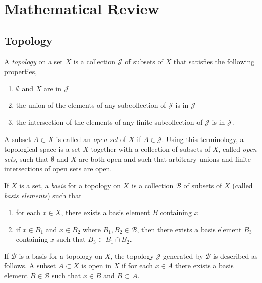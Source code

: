 \chapter{Mathematical Review}

\section{Topology}

\begin{definition}
A \emph{topology} on a set $X$ is a collection $\mathcal{J}$ of subsets of $X$ that satisfies the following properties,
\begin{enumerate}
\item $\emptyset$ and $X$ are in $\mathcal{J}$
\item the union of the elements of any subcollection of $\mathcal{J}$ is in $\mathcal{J}$
\item the intersection of the elements of any finite subcollection of $\mathcal{J}$ is in $\mathcal{J}$.
\end{enumerate}
\end{definition}

A subset $A \subset X$ is called an \emph{open set} of $X$ if $A \in \mathcal{J}$.
Using this terminology, a topological space is a set $X$ together with a collection of subsets of $X$, called \emph{open sets}, such that $\emptyset$ and $X$ are both open and such that arbitrary unions and finite intersections of open sets are open.

\begin{definition}
If $X$ is a set, a \emph{basis} for a topology on $X$ is a collection $\mathcal{B}$ of subsets of $X$ (called \emph{basis elements}) such that
\begin{enumerate}
\item for each $x \in X$, there exists a basis element $B$ containing $x$
\item if $x \in B_1$ and $x \in B_2$ where $B_1, B_2 \in \mathcal{B}$, then there exists a basis element $B_3$ containing $x$ such that $B_3 \subset B_1 \cap B_2$.
\end{enumerate}
\end{definition}

If $\mathcal{B}$ is a basis for a topology on $X$, the topology $\mathcal{J}$ generated by $\mathcal{B}$ is described as follows.
A subset $A \subset X$ is open in $X$ if for each $x \in A$ there exists a basis element $B \in \mathcal{B}$ such that $x \in B$ and $B \subset A$. 


